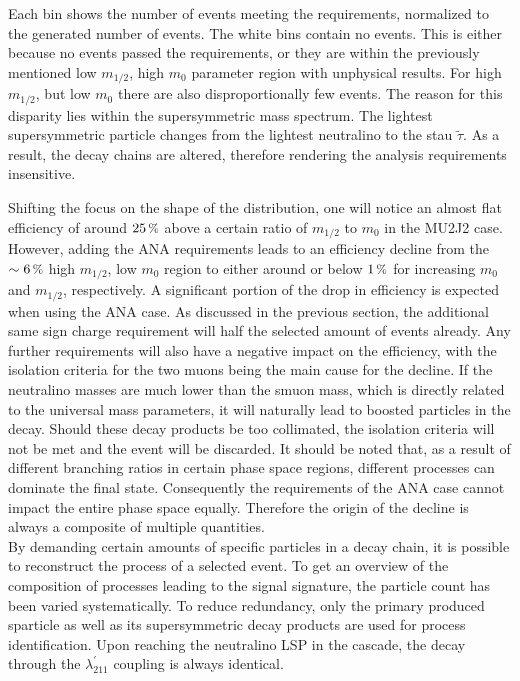 \noindent Each bin shows the number of events meeting the requirements, normalized to the generated number of events. The white bins contain no events. This is either because no events passed the requirements, or they are within the previously mentioned low $m_{1/2}$, high $m_0$ parameter region with unphysical results. For high $m_{1/2}$, but low $m_0$ there are also disproportionally few events. The reason for this disparity lies within the supersymmetric mass spectrum. The lightest supersymmetric particle changes from the lightest neutralino to the stau $\tilde{\tau}$. As a result, the decay chains are altered, therefore rendering the analysis requirements insensitive. 

Shifting the focus on the shape of the distribution, one will notice an almost flat efficiency of around $25\,\pct$ above a certain ratio of $m_{1/2}$ to $m_0$ in the MU2J2 case. However, adding the ANA requirements leads to an efficiency decline from the $\sim 6\,\pct$ high $m_{1/2}$, low $m_0$ region to either around or below $1\,\pct$ for increasing $m_0$ and $m_{1/2}$, respectively. A significant portion of the drop in efficiency is expected when using the ANA case. As discussed in the previous section, the additional same sign charge requirement will half the selected amount of events already. Any further requirements will also have a negative impact on the efficiency, with the isolation criteria for the two muons being the main cause for the decline. If the neutralino masses are much lower than the smuon mass, which is directly related to the universal mass parameters, it will naturally lead to boosted particles in the decay. Should these decay products be too collimated, the isolation criteria will not be met and the event will be discarded. It should be noted that, as a result of different branching ratios in certain phase space regions, different processes can dominate the final state. Consequently the requirements of the ANA case cannot impact the entire phase space equally. Therefore the origin of the decline is always a composite of multiple quantities. \\

By demanding certain amounts of specific particles in a decay chain, it is possible to reconstruct the process of a selected event. To get an overview of the composition of processes leading to the signal signature, the particle count has been varied systematically. To reduce redundancy, only the primary produced sparticle as well as its supersymmetric decay products are used for process identification. Upon reaching the neutralino LSP in the cascade, the decay through the $\lambda^\prime_{211}$ coupling is always identical.

